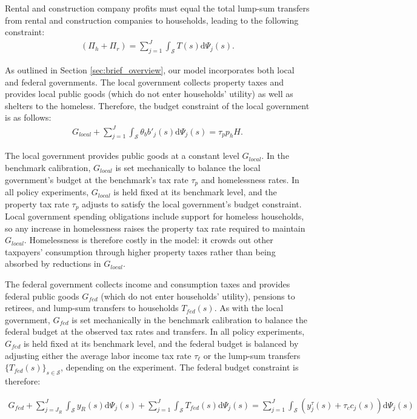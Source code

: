 \documentclass[parskip=full]{article}
\begin{document}
Rental and construction company profits must equal the total lump-sum transfers from rental and construction companies to households, leading to the following constraint:
\begin{align}\label{eq:rebates}
   (\Pi_h+\Pi_r)=\sum_{j=1}^J \int_\mathcal{S} T(s)\mathrm{d}\Psi_j(s).
\end{align}

As outlined in Section \ref{sec:brief_overview}, our model incorporates both local and federal governments. The local government collects property taxes and provides local public goods (which do not enter households' utility) as well as shelters to the homeless. Therefore, the budget constraint of the local government is as follows:
\begin{align}\label{eq:gbc_1}
  G_{local} +\sum_{j=1}^J \int_\mathcal{S} \theta_{b} b'_{j}(s)\mathrm{d}\Psi_j(s) = \tau_{p} p_h H.
\end{align}

\noindent The local government provides public goods at a constant level $G_{local}$. In the benchmark calibration, $G_{local}$ is set mechanically to balance the local government's budget at the benchmark's tax rate $\tau_p$ and homelessness rates. In all policy experiments, $G_{local}$ is held fixed at its benchmark level, and the property tax rate $\tau_p$ adjusts to satisfy the local government's budget constraint. Local government spending obligations include support for homeless households, so any increase in homelessness raises the property tax rate required to maintain $G_{local}$. Homelessness is therefore costly in the model: it crowds out other taxpayers' consumption through higher property taxes rather than being absorbed by reductions in $G_{local}$.

The federal government collects income and consumption taxes and provides federal public goods $G_{fed}$ (which do not enter households' utility), pensions to retirees, and lump-sum transfers to households $T_{fed}(s)$. As with the local government, $G_{fed}$ is set mechanically in the benchmark calibration to balance the federal budget at the observed tax rates and transfers. In all policy experiments, $G_{fed}$ is held fixed at its benchmark level, and the federal budget is balanced by adjusting either the average labor income tax rate $\tau_\ell$ or the lump-sum transfers $\{T_{fed}(s)\}_{s\in \mathcal{S}}$, depending on the experiment. The federal budget constraint is therefore:

\begin{align}\label{eq:gbc_2}
   G_{fed}+\sum_{j=J_R}^J \int_\mathcal{S} y_{R}(s)\mathrm{d}\Psi_j(s)+\sum_{j=1}^J \int_\mathcal{S} T_{fed}(s) \mathrm{d}\Psi_j(s)=\sum_{j=1}^J \int_\mathcal{S} \left(y^{\tau}_{j}(s)+\tau_{c}c_{j}(s)\right)\mathrm{d}\Psi_j(s) 
\end{align}
\end{document}

